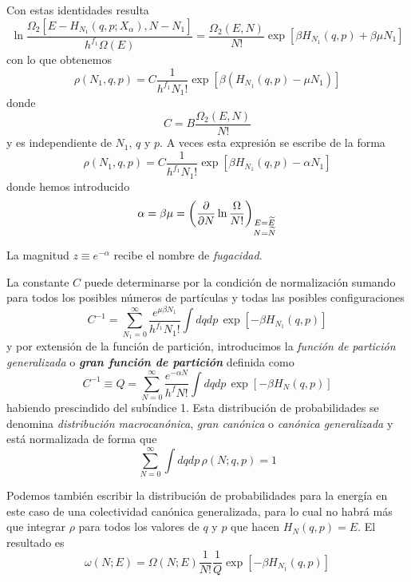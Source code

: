 Con estas identidades resulta
\begin{equation}
	\ln \frac{\Omega_2 \left[ E - H_{N_1}(q,p;X_\alpha), N-N_1 \right]}{h^{f_1} \Omega(E)} = \frac{\Omega_2(E,N)}{N!} \exp\left[ \beta H_{N_1}(q,p) + \beta\mu N_1 \right]
\end{equation}
con lo que obtenemos
\begin{equation}
	\rho(N_1,q,p) = C\frac{1}{h^{f_1}N_1!}\exp\left[ \beta \left( H_{N_1}(q,p) - \mu N_1\right)  \right]
\end{equation}
donde
$$C = B\frac{\Omega_2(E,N)}{N!}$$
y es independiente de $N_1$, $q$ y $p$. A veces esta expresión se escribe de la forma
\begin{equation}
	\rho(N_1,q,p) = C\frac{1}{h^{f_1}N_1!}\exp\left[ \beta H_{N_1}(q,p) - \alpha N_1  \right]
\end{equation}
donde hemos introducido
\begin{equation}
	\alpha = \beta\mu = \left( \pdv{N} \ln\frac{\Omega}{N!}\right)_{\substack{E = \widetilde{E} \\ N = \widetilde{N}}}
\end{equation}

La magnitud $z \equiv e^{-\alpha}$ recibe el nombre de \emph{fugacidad}.

La constante $C$ puede determinarse por la condición de normalización sumando para todos los posibles números de partículas y todas las posibles configuraciones
$$C^{-1} = \sum_{N_1 = 0}^{\infty} \frac{e^{\mu\beta N_1}}{h^{f_1} N_1!} \int dqdp \, \exp\left[ -\beta H_{N_1}(q,p) \right]$$
y por extensión de la función de partición, introducimos la \emph{función de partición generalizada} o \textbf{\emph{gran función de partición}} definida como
\begin{equation}
	C^{-1} \equiv  \boxed{Q = \sum_{N = 0}^{\infty} \frac{e^{-\alpha N}}{h^{f} N!} \int dqdp \, \exp\left[ -\beta H_{N}(q,p) \right]}
\end{equation}
habiendo prescindido del subíndice 1. Esta distribución de probabilidades se denomina \textit{distribución macrocanónica}, \textit{gran canónica} o \textit{canónica generalizada} y está normalizada de forma que
$$\sum_{N = 0}^\infty \int dqdp \, \rho(N; q,p) = 1$$

Podemos también escribir la distribución de probabilidades para la energía en este caso de una colectividad canónica generalizada, para lo cual no habrá más que integrar $\rho$ para todos los valores de $q$ y $p$ que hacen $H_N(q, p) = E$.
El resultado es
\begin{equation}
	\omega(N; E) = \Omega(N; E) \frac{1}{N!}\frac{1}{Q} \exp\left[ -\beta H_{N_1}(q,p) \right]
\end{equation}

